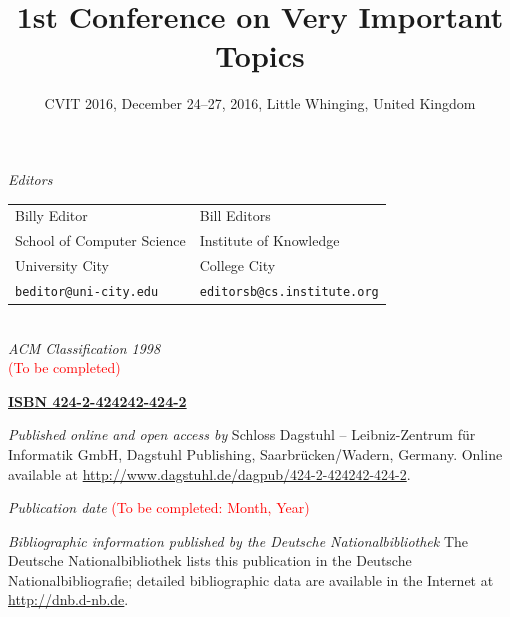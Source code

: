 \documentclass[a4paper,UKenglish]{oasicsmaster-v2016}
\title{\huge 1st Conference on Very Important Topics}
\subtitle{CVIT 2016, December 24--27, 2016, Little Whinging, United Kingdom}
\newcommand{\VolumeISBN}{424-2-424242-424-2}
\begin{document}
\frontmatter


\maketitle


\begin{publicationinfo}%
\sffamily

\emph{Editors} \\[0.2cm]
\begin{tabular}{ll}
Billy Editor              &   Bill Editors   \\
School of Computer Science   &  Institute of Knowledge \\ 
University City & College City \\ 
\texttt{beditor@uni-city.edu} &  \texttt{editorsb@cs.institute.org}
\end{tabular}
\ \\

\bigskip
\bigskip
\bigskip
\bigskip
\emph{ACM Classification 1998}\\
\textcolor{red}{(To be completed)}

\bigskip
\bigskip

{\Large\bf\sffamily \href{http://www.dagstuhl.de/dagpub/\VolumeISBN}{ISBN \VolumeISBN}}

\bigskip
\bigskip

\emph{Published online and open access by}\newline
Schloss Dagstuhl -- Leibniz-Zentrum f\"ur Informatik GmbH, Dagstuhl Publishing, Saarbr\"ucken/Wadern, Germany. Online available at \href{http://www.dagstuhl.de/dagpub/\VolumeISBN}{http://www.dagstuhl.de/dagpub/\VolumeISBN}.

\bigskip
\emph{Publication date}\newline
\textcolor{red}{(To be completed: Month, Year)}

\bigskip
\bigskip

\emph{Bibliographic information published by the Deutsche Nationalbibliothek}\newline
The Deutsche Nationalbibliothek lists this publication in the Deutsche Nationalbibliografie; detailed bibliographic data are available in the Internet at \href{http://dnb.d-nb.de}{http://dnb.d-nb.de}. 


\end{publicationinfo}
\end{document}
